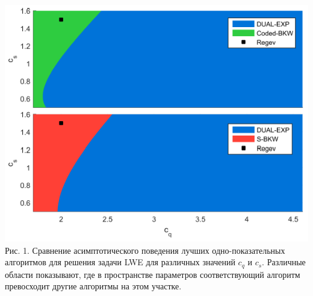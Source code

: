 \documentclass[a4paper,11pt]{article}
\begin{document}
\begin{center}
\includegraphics[scale=0.5]{1.png}\\
Рис. 1. Сравнение асимптотического поведения лучших одно-показательных алгоритмов для решения задачи LWE для различных значений $c_q$ и $c_s$. Различные области показывают, где в пространстве параметров соответствующий алгоритм превосходит другие алгоритмы на этом участке.
\end{center}
\end{document}
